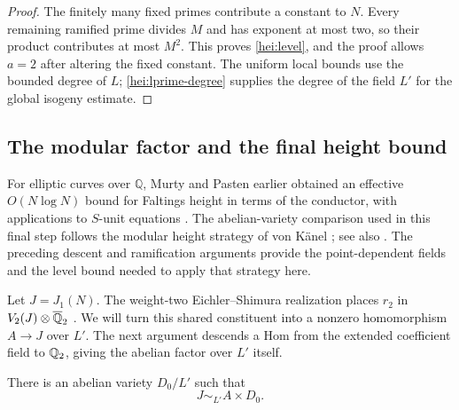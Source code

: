 \begin{proof}
The finitely many fixed primes contribute a constant to $N$.  Every
remaining ramified prime divides $M$ and has exponent at most two,
so their product contributes at most $M^2$.  This proves
\eqref{hei:level}, and the proof allows $a=2$ after altering the fixed
constant.  The uniform local bounds use the bounded degree of $L$;
\eqref{hei:lprime-degree} supplies the degree of the field $L'$ for
the global isogeny estimate.
\end{proof}

\subsection{The modular factor and the final height bound}
\label{hei:final-height}

For elliptic curves over \(\mathbb Q\), Murty and Pasten earlier
obtained an effective \(O(N\log N)\) bound for Faltings height in
terms of the conductor, with applications to \(S\)-unit equations
\cite[Theorems~1.1 and~7.1]{MurtyPasten2013}.  The abelian-variety
comparison used in this final step follows the modular height
strategy of von K\"anel \cite[Sections~1.2 and~5]{vonKaenel2021};
see also \cite{Alpoge2021}.
The preceding descent and ramification arguments provide the
point-dependent fields and the level bound needed to apply that strategy
here.

Let $J=J_1(N)$.  The weight-two Eichler--Shimura realization places
$r_2$ in $V_2(J)\otimes\overline{\mathbb Q}_2$
\cite[Theorem~2.1 and the following weight-two realization]{Ribet1977Nebentypus}.
We will turn this shared constituent into a nonzero homomorphism
$A\to J$ over $L'$.  The next argument descends a Hom from the
extended coefficient field to $\mathbb Q_2$, giving the abelian factor over
$L'$ itself.

\begin{lemma}\label{hei:modular-factor}
There is an abelian variety $D_0/L'$ such that
\[
                             J\sim_{L'}A\times D_0.
\]
\end{lemma}

